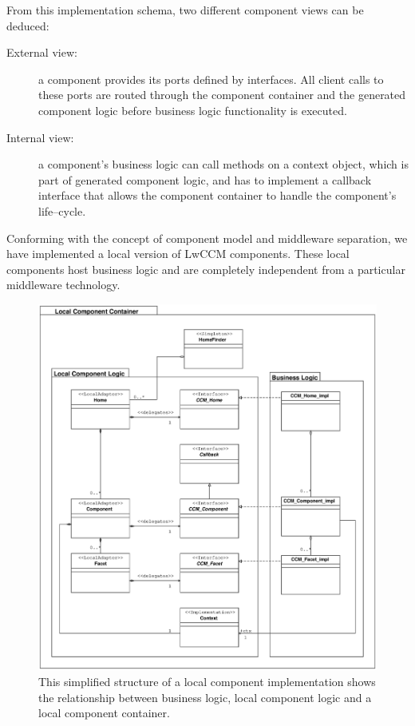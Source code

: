 \noindent
From this implementation schema, two different component views can be deduced:
\begin{description}
\item [External view:]
  a component provides its ports defined by interfaces. All 
  client calls to these ports are routed through the component container and 
  the generated component logic before business logic functionality is
  executed.
  
\item [Internal view:]
  a component's business logic can call methods on a context 
  object, which is part of generated component logic, and has to implement 
  a callback interface that allows the component container to handle the 
  component's life--cycle.
\end{description}


\noindent
Conforming with the concept of component model and 
middleware separation, we have implemented a local version of LwCCM components.
These local components host business logic and are completely independent 
from a particular middleware technology.

\begin{figure}[htbp]
    \begin{center}
    \includegraphics [width=15cm,angle=0] {uml/StructureOfLocalComponents.eps}
    \caption{This simplified structure of a local component implementation
    shows the relationship between business logic, local component logic and
    a local component container.}
    \label{StructureOfLocalComponents}            
    \end{center}
\end{figure}

